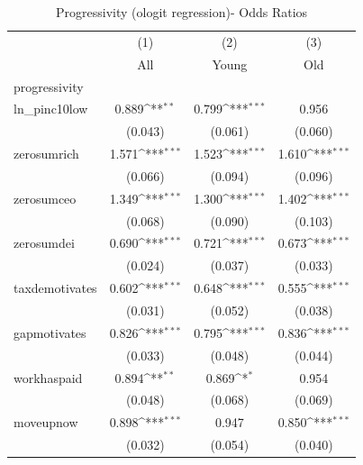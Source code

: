 \begin{table}[htbp]\centering
\def\sym#1{\ifmmode^{#1}\else\(^{#1}\)\fi}
\caption{Progressivity (ologit regression)- Odds Ratios}
\begin{tabular}{l*{3}{c}}
\toprule
            &\multicolumn{1}{c}{(1)}&\multicolumn{1}{c}{(2)}&\multicolumn{1}{c}{(3)}\\
            &\multicolumn{1}{c}{All}&\multicolumn{1}{c}{Young}&\multicolumn{1}{c}{Old}\\
\midrule
progressivity&                     &                     &                     \\
ln\_pinc10low&       0.889\sym{**} &       0.799\sym{***}&       0.956         \\
            &     (0.043)         &     (0.061)         &     (0.060)         \\
\addlinespace
zerosumrich &       1.571\sym{***}&       1.523\sym{***}&       1.610\sym{***}\\
            &     (0.066)         &     (0.094)         &     (0.096)         \\
\addlinespace
zerosumceo  &       1.349\sym{***}&       1.300\sym{***}&       1.402\sym{***}\\
            &     (0.068)         &     (0.090)         &     (0.103)         \\
\addlinespace
zerosumdei  &       0.690\sym{***}&       0.721\sym{***}&       0.673\sym{***}\\
            &     (0.024)         &     (0.037)         &     (0.033)         \\
\addlinespace
taxdemotivates&       0.602\sym{***}&       0.648\sym{***}&       0.555\sym{***}\\
            &     (0.031)         &     (0.052)         &     (0.038)         \\
\addlinespace
gapmotivates&       0.826\sym{***}&       0.795\sym{***}&       0.836\sym{***}\\
            &     (0.033)         &     (0.048)         &     (0.044)         \\
\addlinespace
workhaspaid &       0.894\sym{**} &       0.869\sym{*}  &       0.954         \\
            &     (0.048)         &     (0.068)         &     (0.069)         \\
\addlinespace
moveupnow   &       0.898\sym{***}&       0.947         &       0.850\sym{***}\\
            &     (0.032)         &     (0.054)         &     (0.040)         \\

\end{tabular}
\end{table}
